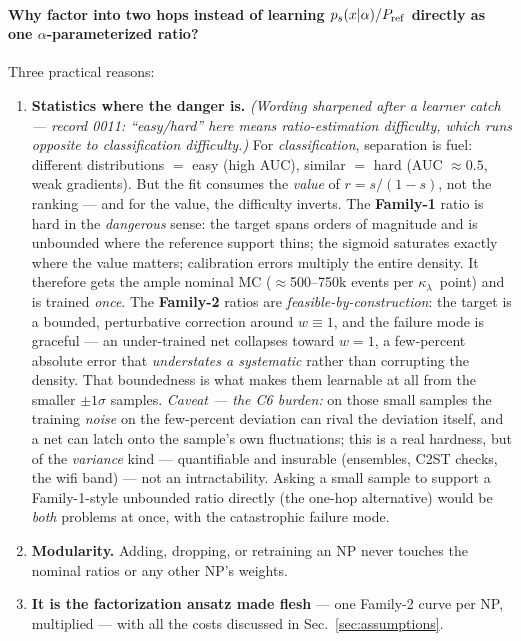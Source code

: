 \documentclass[11pt]{article}
\newcommand{\kl}{\ensuremath{\kappa_\lambda}}
\begin{document}
\paragraph{Why factor into two hops instead of learning $p_s(x|\alpha)/P_{\rm ref}$ directly as one
$\alpha$-parameterized ratio?} Three practical reasons:
\begin{enumerate}
\item \textbf{Statistics where the danger is.} \emph{(Wording sharpened after a learner catch --- record 0011:
  ``easy/hard'' here means ratio-\emph{estimation} difficulty, which runs \emph{opposite} to classification
  difficulty.)} For \emph{classification}, separation is fuel: different distributions $=$ easy (high AUC),
  similar $=$ hard (AUC $\approx0.5$, weak gradients). But the fit consumes the \emph{value} of $r=s/(1-s)$,
  not the ranking --- and for the value, the difficulty inverts. The \textbf{Family-1} ratio is hard in the
  \emph{dangerous} sense: the target spans orders of magnitude and is unbounded where the reference support
  thins; the sigmoid saturates exactly where the value matters; calibration errors multiply the entire density.
  It therefore gets the ample nominal MC ($\approx$500--750k events per \kl\ point) and is trained \emph{once}.
  The \textbf{Family-2} ratios are \emph{feasible-by-construction}: the target is a bounded, perturbative
  correction around $w\equiv1$, and the failure mode is graceful --- an under-trained net collapses toward
  $w=1$, a few-percent absolute error that \emph{understates a systematic} rather than corrupting the density.
  That boundedness is what makes them learnable at all from the smaller $\pm1\sigma$ samples.
  \emph{Caveat --- the C6 burden:} on those small samples the training \emph{noise} on the few-percent deviation
  can rival the deviation itself, and a net can latch onto the sample's own fluctuations; this is a real
  hardness, but of the \emph{variance} kind --- quantifiable and insurable (ensembles, C2ST checks, the wifi
  band) --- not an intractability. Asking a small sample to support a Family-1-style unbounded ratio directly
  (the one-hop alternative) would be \emph{both} problems at once, with the catastrophic failure mode.
\item \textbf{Modularity.} Adding, dropping, or retraining an NP never touches the nominal ratios or any other
  NP's weights.
\item \textbf{It is the factorization ansatz made flesh} --- one Family-2 curve per NP, multiplied --- with all
  the costs discussed in Sec.~\ref{sec:assumptions}.
\end{enumerate}
\end{document}
